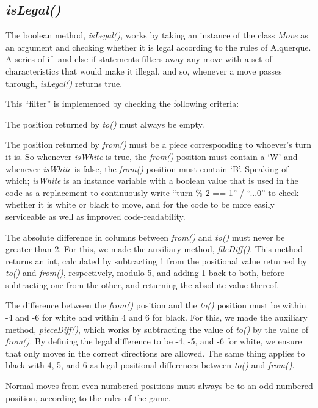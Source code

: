 \documentclass[12pt, a4paper]{article}
\begin{document}
\subsection{\emph{isLegal()}}
The boolean method, \emph{isLegal()}, works by taking an instance of the class \emph{Move} as an argument and checking whether it is legal according to the rules of Alquerque. A series of if- and else-if-statements filters away any move with a set of characteristics that would make it illegal, and so, whenever a move passes through, \emph{isLegal()} returns true. \par 
\newpage
This “filter” is implemented by checking the following criteria: \par
The position returned by \emph{to()} must always be empty. \par 
The position returned by \emph{from()} must be a piece corresponding to whoever's turn it is. So whenever \emph{isWhite} is true, the \emph{from()} position must contain a ‘W’ and whenever \emph{isWhite} is false, the \emph{from()} position must contain ‘B’. Speaking of which; \emph{isWhite} is an instance variable with a boolean value that is used in the code as a replacement to continuously write “turn \% 2 == 1” / “...0”  to check whether it is white or black to move, and for the code to be more easily serviceable as well as improved code-readability. \par
The absolute difference in columns between \emph{from()} and \emph{to()} must never be greater than 2. For this, we made the auxiliary method, \emph{fileDiff()}. This method returns an int, calculated by subtracting 1 from the positional value returned by \emph{to()} and \emph{from()}, respectively, modulo 5, and adding 1 back to both, before subtracting one from the other, and returning the absolute value thereof. \par 
The difference between the \emph{from()} position and the \emph{to()} position must be within -4 and -6 for white and within 4 and 6 for black. For this, we made the auxiliary method, \emph{pieceDiff()}, which works by subtracting the value of \emph{to()} by the value of \emph{from()}. By defining the legal difference to be -4, -5, and -6 for white, we ensure that only moves in the correct directions are allowed. The same thing applies to black with 4, 5, and 6 as legal positional differences between \emph{to()} and \emph{from()}. \par
Normal moves from even-numbered positions must always be to an odd-numbered position, according to the rules of the game. \par
\end{document}
